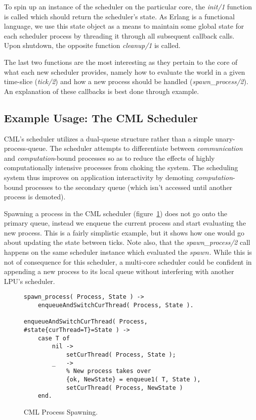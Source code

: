 To spin up an instance of the scheduler on the particular core, the 
\emph{init/1} function is called which should return the scheduler's state. 
As Erlang is a functional language, we use this state object as a means to
maintain some global state for each scheduler process by threading it through
all subsequent callback calls. Upon shutdown, the opposite function 
\emph{cleanup/1} is called.

The last two functions are the most interesting as they pertain to the core of
what each new scheduler provides, namely how to evaluate the world in a given
time-slice (\emph{tick/2}) and how a new process should be handled 
(\emph{spawn\_process/2}). An explanation of these callbacks is best done 
through example.

\subsection{Example Usage: The CML Scheduler}\label{sec:example the cml scheduler}

CML's scheduler utilizes a dual-queue structure rather than
a simple unary-process-queue. The scheduler attempts to differentiate between
{\em communication} and {\em computation}-bound processes so as to reduce the
effects of highly computationally intensive processes from choking the system.
The scheduling system thus improves on application interactivity by demoting 
{\em computation}-bound processes to the secondary queue (which isn't accessed
until another process is demoted).

Spawning a process in the CML scheduler (figure~\ref{fig:cml-spawn-process}) 
does not go onto the primary queue, instead we enqueue the current process and 
start evaluating the new process. This is a fairly simplistic example, but it 
shows how one would go about updating the state between ticks. Note also, that
the \emph{spawn\_process/2} call happens on the same scheduler instance which
evaluated the $spawn$. While this is not of consequence for this scheduler, a
multi-core scheduler could be confident in appending a new process to its local
queue without interfering with another LPU's scheduler.

\begin{figure}
\begin{verbatim}
spawn_process( Process, State ) -> 
    enqueueAndSwitchCurThread( Process, State ).

enqueueAndSwitchCurThread( Process, #state{curThread=T}=State ) ->
    case T of
        nil ->
            setCurThread( Process, State );
        _   ->
            % New process takes over
            {ok, NewState} = enqueue1( T, State ), 
            setCurThread( Process, NewState )
    end.
\end{verbatim}
\caption{CML Process Spawning.}
\label{fig:cml-spawn-process}
\end{figure}

